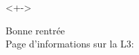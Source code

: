 \documentclass{beamer}
\begin{document}
%



\begin{frame}
 

\begin{block}<+->{}\begin{center}Bonne rentrée\\
Page d'informations sur la L3:\\
\end{center}
\end{block}

\end{frame}
\end{document}
